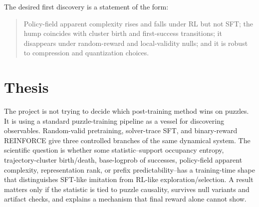 \documentclass[11pt]{article}
\begin{document}
The desired first discovery is a statement of the form:

\begin{quote}
Policy-field apparent complexity rises and falls under RL but not SFT; the hump
coincides with cluster birth and first-success transitions; it disappears under
random-reward and local-validity nulls; and it is robust to compression and
quantization choices.
\end{quote}

\section*{Thesis}

The project is not trying to decide which post-training method wins on puzzles.
It is using a standard puzzle-training pipeline as a vessel for discovering
observables. Random-valid pretraining, solver-trace SFT, and binary-reward
REINFORCE give three controlled branches of the same dynamical system. The
scientific question is whether some statistic--support occupancy entropy,
trajectory-cluster birth/death, base-logprob of successes, policy-field apparent
complexity, representation rank, or prefix predictability--has a training-time
shape that distinguishes SFT-like imitation from RL-like exploration/selection.
A result matters only if the statistic is tied to puzzle causality, survives
null variants and artifact checks, and explains a mechanism that final reward
alone cannot show.
\end{document}
